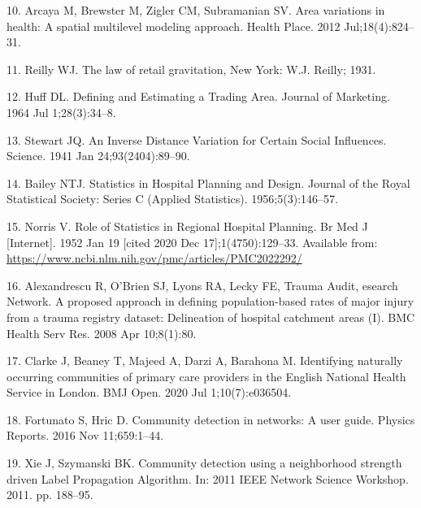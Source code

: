 \documentclass[
]{article}
\begin{document}
\leavevmode\hypertarget{ref-arcayaAreaVariationsHealth2012}{}%
10. Arcaya M, Brewster M, Zigler CM, Subramanian SV. Area variations in
health: A spatial multilevel modeling approach. Health Place. 2012
Jul;18(4):824--31.

\leavevmode\hypertarget{ref-reillyLawRetailGravitation1931}{}%
11. Reilly WJ. The law of retail gravitation, New York: W.J. Reilly;
1931.

\leavevmode\hypertarget{ref-huffDefiningEstimatingTrading1964}{}%
12. Huff DL. Defining and Estimating a Trading Area. Journal of
Marketing. 1964 Jul 1;28(3):34--8.

\leavevmode\hypertarget{ref-stewartInverseDistanceVariation1941}{}%
13. Stewart JQ. An Inverse Distance Variation for Certain Social
Influences. Science. 1941 Jan 24;93(2404):89--90.

\leavevmode\hypertarget{ref-baileyStatisticsHospitalPlanning1956}{}%
14. Bailey NTJ. Statistics in Hospital Planning and Design. Journal of
the Royal Statistical Society: Series C (Applied Statistics).
1956;5(3):146--57.

\leavevmode\hypertarget{ref-norrisRoleStatisticsRegional1952}{}%
15. Norris V. Role of Statistics in Regional Hospital Planning. Br Med J
{[}Internet{]}. 1952 Jan 19 {[}cited 2020 Dec 17{]};1(4750):129--33.
Available from:
\url{https://www.ncbi.nlm.nih.gov/pmc/articles/PMC2022292/}

\leavevmode\hypertarget{ref-alexandrescuProposedApproachDefining2008}{}%
16. Alexandrescu R, O'Brien SJ, Lyons RA, Lecky FE, Trauma Audit,
esearch Network. A proposed approach in defining population-based rates
of major injury from a trauma registry dataset: Delineation of hospital
catchment areas (I). BMC Health Serv Res. 2008 Apr 10;8(1):80.

\leavevmode\hypertarget{ref-clarkeIdentifyingNaturallyOccurring2020}{}%
17. Clarke J, Beaney T, Majeed A, Darzi A, Barahona M. Identifying
naturally occurring communities of primary care providers in the English
National Health Service in London. BMJ Open. 2020 Jul 1;10(7):e036504.

\leavevmode\hypertarget{ref-fortunatoCommunityDetectionNetworks2016}{}%
18. Fortunato S, Hric D. Community detection in networks: A user guide.
Physics Reports. 2016 Nov 11;659:1--44.

\leavevmode\hypertarget{ref-xieCommunityDetectionUsing2011}{}%
19. Xie J, Szymanski BK. Community detection using a neighborhood
strength driven Label Propagation Algorithm. In: 2011 IEEE Network
Science Workshop. 2011. pp. 188--95.
\end{document}
